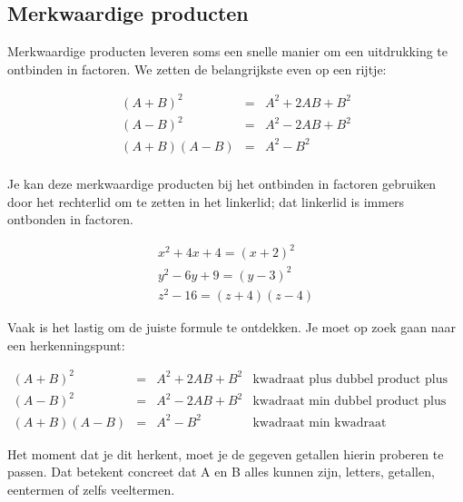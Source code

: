\subsection{Merkwaardige producten}
Merkwaardige producten leveren soms een snelle manier om een uitdrukking te ontbinden in factoren. We zetten de belangrijkste even op een rijtje:

		\begin{ftonthoud}
			\begin{eqnarray*}
		(A+B)^2 &=& A^2+2AB+B^2 \\
		(A-B)^2 &=& A^2-2AB+B^2 \\
		(A+B)(A-B) &=& A^2-B^2 \\
		\end{eqnarray*}
		\end{ftonthoud}

Je kan deze merkwaardige producten bij het ontbinden in factoren gebruiken door het rechterlid om te zetten in het linkerlid; dat linkerlid is immers ontbonden in factoren.

\begin{voorbeeld}
	\begin{eqnarray*}
	x^2+4x+4=(x+2)^2\\
	y^2-6y+9=(y-3)^2\\
	z^2-16=(z+4)(z-4)
	\end{eqnarray*}
\end{voorbeeld}

Vaak is het lastig om de juiste formule te ontdekken. Je moet op zoek gaan naar een herkenningspunt:

\begin{center}
	$\begin{array}{ccll}
	(A+B)^2 &=& A^2+2AB+B^2 & \text{kwadraat plus dubbel product plus kwadraat} \\
	(A-B)^2 &=& A^2-2AB+B^2 & \text{kwadraat min dubbel product plus kwadraat} \\
	(A+B)(A-B) &=& A^2-B^2 & \text{kwadraat min kwadraat}
	\end{array}$
\end{center}

Het moment dat je dit herkent, moet je de gegeven getallen hierin proberen te passen. Dat betekent concreet dat A en B alles kunnen zijn, letters, getallen, eentermen of zelfs veeltermen.

